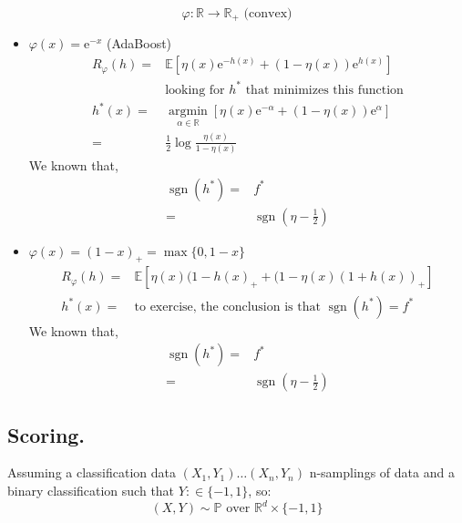 					\[
						{\varphi}:\mathbb{R}\rightarrow\mathbb{R}_+ \mbox{ (convex)}
					\]
			\begin{itemize}
				\item $\varphi(x)=\mbox{e}^{-x}$ (AdaBoost)
		                   \begin{align*}
                             R_{\varphi}(h) = & \mathbb{E}[\eta(x)\mbox{e}^{-h(x)}+(1-\eta(x))\mbox{e}^{h(x)}] \\
                                             &  \mbox{looking for }h^* \mbox{ that minimizes this function}\\
                                            h^*(x) = &  \underset{\alpha \in \mathbb{R}}{\operatorname{argmin}}[\eta(x)\mbox{e}^{-\alpha}+(1-\eta(x))\mbox{e}^{\alpha}]\\
                                            = &  \frac{1}{2}\log\frac{\eta(x)}{1-\eta(x)}
		                   \end{align*}
								We known that, 
		                   \begin{align*}
                             \operatorname{sgn}(h^*) = & f^*\\
                                             = &  \operatorname{sgn}(\eta - \frac{1}{2})
		                   \end{align*} 
				\item $\varphi(x)=(1-x)_+ = \operatorname{max}\{0,1-x\}$
		                   \begin{align*}
                             R_{\varphi}(h) = & \mathbb{E}[\eta(x)(1-h(x)_+ + (1-\eta(x)(1+h(x))_+] \\
                                            h^*(x) = &  \mbox{to exercise, the conclusion is that } \operatorname{sgn}(h^*)=f^*
		                   \end{align*}
								We known that, 
		                   \begin{align*}
                             \operatorname{sgn}(h^*) = & f^*\\
                                             = &  \operatorname{sgn}(\eta - \frac{1}{2})
		                   \end{align*}
			\end{itemize}

	   \subsection{Scoring.}

			Assuming a classification data $(X_1,Y_1)\ldots(X_n,Y_n)$ n-samplings of data and a binary classification such that $Y:\in \{-1,1\}$, so: 
			\[
				(X,Y) \sim \mathbb{P}\mbox{ over }\mathbb{R}^d\times\{-1,1\}
			\] 
				
